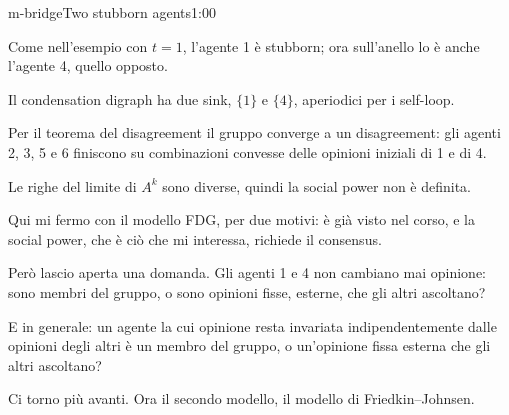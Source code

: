 \begin{slide}{m-bridge}{Two stubborn agents}{1:00}
  \begin{discorso}
    \item Come nell'esempio con $t=1$, l'agente 1 è stubborn; ora sull'anello lo è anche l'agente 4, quello opposto.
    \item Il condensation digraph ha due sink, $\{1\}$ e $\{4\}$, aperiodici per i self-loop.
    \item Per il teorema del disagreement il gruppo converge a un disagreement: gli agenti 2, 3, 5 e 6 finiscono su combinazioni convesse delle opinioni iniziali di 1 e di 4.
    \item Le righe del limite di $A^k$ sono diverse, quindi la social power non è definita.
    \item Qui mi fermo con il modello FDG, per due motivi: è già visto nel corso, e la social power, che è ciò che mi interessa, richiede il consensus.
    \item Però lascio aperta una domanda. Gli agenti 1 e 4 non cambiano mai opinione: sono membri del gruppo, o sono opinioni fisse, esterne, che gli altri ascoltano?
    \item E in generale: un agente la cui opinione resta invariata indipendentemente dalle opinioni degli altri è un membro del gruppo, o un'opinione fissa esterna che gli altri ascoltano?
    \item Ci torno più avanti. Ora il secondo modello, il modello di Friedkin–Johnsen.
  \end{discorso}
\end{slide}


